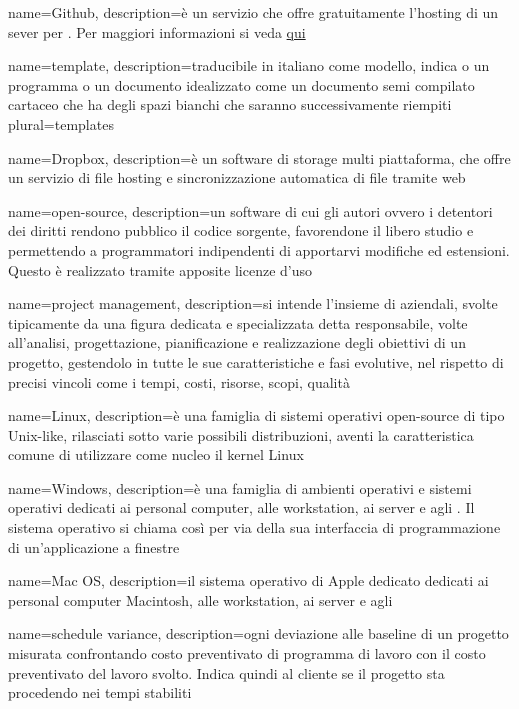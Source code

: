  {
	name=Github,
	description={è un servizio che offre gratuitamente l'hosting di un sever per . Per maggiori informazioni si veda \href{https://github.com}{qui}}
}

 {
	name=template,
	description={traducibile in italiano come modello, indica o un programma o un documento idealizzato come un documento semi compilato cartaceo che ha degli spazi bianchi che saranno successivamente riempiti}
	plural=templates
}

 {
	name=Dropbox,
	description={è un software di  storage multi piattaforma, che offre un servizio di file hosting e sincronizzazione automatica di file tramite web}
}

 {
	name=open-source,
	description={un software di cui gli autori ovvero i detentori dei diritti rendono pubblico il codice sorgente, favorendone il libero studio e permettendo a programmatori indipendenti di apportarvi modifiche ed estensioni. Questo è realizzato tramite apposite licenze d'uso}
}

 {
	name=project management,
	description={si intende l'insieme di  aziendali, svolte tipicamente da una figura dedicata e specializzata detta responsabile, volte all'analisi, progettazione, pianificazione e realizzazione degli obiettivi di un progetto, gestendolo in tutte le sue caratteristiche e fasi evolutive, nel rispetto di precisi vincoli come i tempi, costi, risorse, scopi, qualità}
}

 {
	name=Linux,
	description={è una famiglia di sistemi operativi open-source di tipo Unix-like, rilasciati sotto varie possibili distribuzioni, aventi la caratteristica comune di utilizzare come nucleo il kernel Linux}
}

 {
	name=Windows,
	description={è una famiglia di ambienti operativi e sistemi operativi dedicati ai personal computer, alle workstation, ai server e agli . Il sistema operativo si chiama così per via della sua interfaccia di programmazione di un'applicazione a finestre}
}

 {
	name=Mac OS,
	description={il sistema operativo di Apple dedicato dedicati ai personal computer Macintosh, alle workstation, ai server e agli   }
}


 {
	name=schedule variance,
	description={ogni deviazione alle baseline di un progetto misurata confrontando costo preventivato di programma di lavoro con il costo preventivato del lavoro svolto. Indica quindi al cliente se il progetto sta procedendo nei tempi stabiliti}
}

